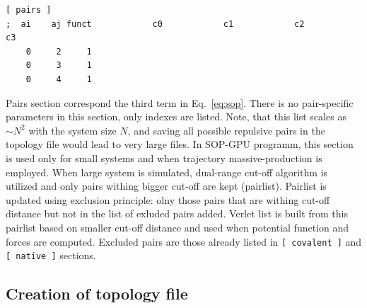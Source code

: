 \documentclass[a4paper]{article}
\begin{document}
\begin{verbatim}
[ pairs ]
;  ai    aj funct            c0            c1            c2            c3
    0     2     1
    0     3     1
    0     4     1
\end{verbatim}

Pairs section correspond the third term in Eq.~\ref{eq:sop}. There is no pair-specific parameters in this section, only indexes are listed. Note, that this list scales as $\sim N^2$ with the system size $N$, and saving all possible repulsive pairs in the topology file would lead to very large files. In SOP-GPU programm, this section is used only for small systems and when trajectory massive-production is employed. When large system is simulated, dual-range cut-off algorithm is utilized and only pairs withing bigger cut-off are kept (pairlist). Pairlist is updated using exclusion principle: olny those pairs that are withing cut-off distance but not in the list of exluded pairs added. Verlet list is built from this pairlist based on smaller cut-off distance and used when potential function and forces are computed. Excluded pairs are those already listed in \texttt{[ covalent ]} and \texttt{[ native ]} sections.

\subsection{Creation of topology file}
\label{sec:topology.creation}
\end{document}

